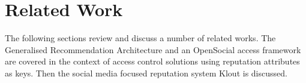 \section{Related Work}

The following sections review and discuss a number of related works. The Generalised Recommendation Architecture and an OpenSocial access framework are covered in the context of access control solutions using reputation attributes as keys. Then the social media focused reputation system Klout is discussed.



